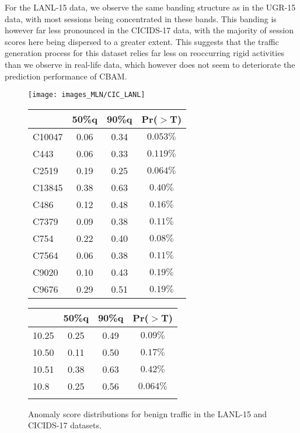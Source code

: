 For the LANL-15 data, we observe the same banding structure as in the UGR-15 data, with most sessions being concentrated in these bands. This banding is however far less pronounced in the CICIDS-17 data, with the majority of session scores here being dispersed to a greater extent. This suggests that the traffic generation process for this dataset relies far less on reoccurring rigid activities than we observe in real-life data, which however does not seem to deteriorate the prediction performance of CBAM. 


\begin{figure}%
    \begin{center}
\texttt{[image: images\_MLN/CIC\_LANL]} 
\begin{tabular}{l|ccc}
  \hline &  50\%q  &  90\%q  & Pr($>$T) \\ 
  \hline
C10047 & 0.06 & 0.34 & $0.053\%$ \\ 
  C443 & 0.06 & 0.33 &  $0.119\%$ \\ 
  C2519 & 0.19 & 0.25 & $0.064\%$ \\ 
  C13845 & 0.38 & 0.63 & $0.40\%$ \\ 
  C486 & 0.12 & 0.48 & $0.16\%$ \\ 
  C7379 & 0.09 & 0.38 & $0.11\%$ \\ 
  C754 & 0.22 & 0.40 &  $0.08\%$ \\ 
  C7564 & 0.06 & 0.38 & $0.11\%$ \\ 
  C9020 & 0.10 & 0.43 & $0.19\%$ \\ 
  C9676 & 0.29 & 0.51 & $0.19\%$ \\ 
   \hline
\end{tabular}
\quad
\begin{tabular}{l|ccc}
  \hline
 &  50\%q  &  90\%q  &  Pr($>$T) \\ 
  \hline
10.25 & 0.25 & 0.49 &  $0.09\%$ \\ 
10.50 & 0.11 & 0.50  & $0.17\%$ \\ 
10.51 & 0.38 & 0.63  & $0.42\%$ \\ 
10.8 & 0.25 & 0.56 & $0.064\%$ \\ 
   \hline
\multicolumn{2}{c}{}
\vspace{2.1cm}
\end{tabular}
\end{center}
\caption{Anomaly score distributions for benign traffic in the LANL-15 and CICIDS-17 datasets.%
}\label{fig:CICrealresults}
\end{figure}


